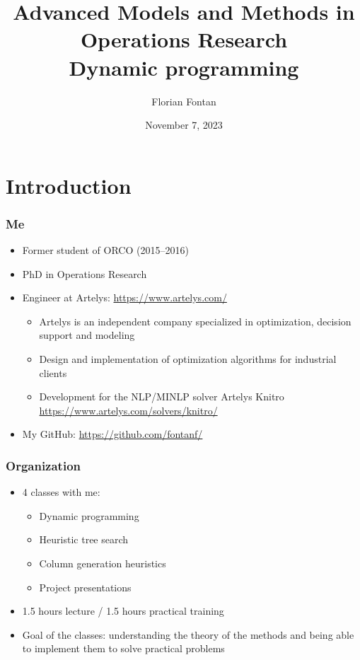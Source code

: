 \documentclass{beamer}
\author{Florian Fontan}
\title{Advanced Models and Methods in Operations Research \\ Dynamic programming}
\date{November 7, 2023}
\begin{document}
\newcommand{\customcite}[1]{\citetitle{#1}, \citeauthor{#1}, \citeyear{#1}}


\maketitle

\section{Introduction}

\begin{frame}
  \frametitle{Me}

  \begin{itemize}
    \item Former student of ORCO (2015--2016)
    \item PhD in Operations Research
    \item Engineer at Artelys: \url{https://www.artelys.com/}
      \begin{itemize}
        \item Artelys is an independent company specialized in optimization, decision support and modeling
        \item Design and implementation of optimization algorithms for industrial clients
        \item Development for the NLP/MINLP solver Artelys Knitro \url{https://www.artelys.com/solvers/knitro/}
      \end{itemize}
    \item My GitHub: \url{https://github.com/fontanf/}
  \end{itemize}
\end{frame}

\begin{frame}
  \frametitle{Organization}
  \begin{itemize}
    \item 4 classes with me:
      \begin{itemize}
        \item Dynamic programming
        \item Heuristic tree search
        \item Column generation heuristics
        \item Project presentations
      \end{itemize}
    \item 1.5 hours lecture / 1.5 hours practical training
      \item Goal of the classes: understanding the theory of the methods and being able to implement them to solve practical problems
  \end{itemize}
\end{frame}
\end{document}
